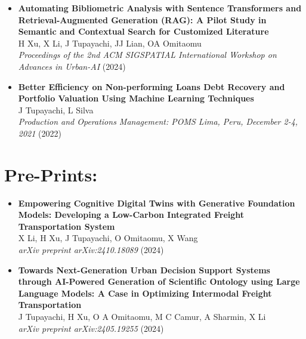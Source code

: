 \documentclass[10pt, letterpaper]{article}
\begin{document}
\begin{itemize}[left=0pt]
        \item \textbf{Automating Bibliometric Analysis with Sentence Transformers and Retrieval-Augmented Generation (RAG): A Pilot Study in Semantic and Contextual Search for Customized Literature} \\
        H Xu, X Li, J Tupayachi, JJ Lian, OA Omitaomu \\
        \textit{Proceedings of the 2nd ACM SIGSPATIAL International Workshop on Advances in Urban-AI} (2024) \\
    
        \item \textbf{Better Efficiency on Non-performing Loans Debt Recovery and Portfolio Valuation Using Machine Learning Techniques} \\
        J Tupayachi, L Silva \\
        \textit{Production and Operations Management: POMS Lima, Peru, December 2-4, 2021} (2022) \\
    
    

    \end{itemize}
    

    \section*{Pre-Prints:}

    \begin{itemize}[left=0pt] 

        \item \textbf{Empowering Cognitive Digital Twins with Generative Foundation Models: Developing a Low-Carbon Integrated Freight Transportation System} \\
        X Li, H Xu, J Tupayachi, O Omitaomu, X Wang \\
        \textit{arXiv preprint arXiv:2410.18089} (2024) \\



        \item \textbf{Towards Next-Generation Urban Decision Support Systems through AI-Powered Generation of Scientific Ontology using Large Language Models: A Case in Optimizing Intermodal Freight Transportation} \\
        J Tupayachi, H Xu, O A Omitaomu, M C Camur, A Sharmin, X Li \\
        \textit{arXiv preprint arXiv:2405.19255} (2024)

    \end{itemize}
    
\end{document}
